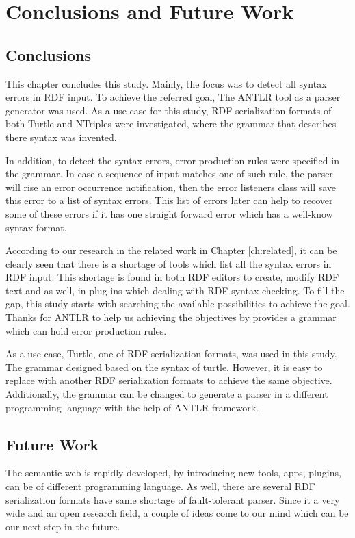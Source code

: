 \chapter{Conclusions and Future Work}
\label{ch:conclusions}

\section{Conclusions}
This chapter concludes this study. Mainly, the focus was to detect all syntax errors in RDF input. To achieve the referred goal, The ANTLR tool as a parser generator was used. As a use case for this study, RDF serialization formats of both Turtle and NTriples were investigated, where the grammar that describes there syntax was invented.

In addition, to detect the syntax errors, error production rules were specified in the grammar. In case a sequence of input matches one of such rule, the parser will rise an error occurrence notification, then the error listeners class will save this error to a list of syntax errors. This list of errors later can help to recover some of these errors if it has one straight forward error which has a well-know syntax format. 

According to our research in the related work in Chapter \ref{ch:related}, it can be clearly seen that there is a shortage of tools which list all the syntax errors in RDF input. This shortage is found in both RDF editors to create, modify RDF text and as well, in plug-ins which dealing with RDF syntax checking. To fill the gap, this study starts with searching the available possibilities to achieve the goal. Thanks for ANTLR to help us achieving the objectives by provides a grammar which can hold error production rules. 

As a use case, Turtle, one of RDF serialization formats, was used in this study. The grammar designed based on the syntax of turtle. However, it is easy to replace with another RDF serialization formats to achieve the same objective. Additionally, the grammar can be changed to generate a parser in a different programming language with the help of ANTLR framework.   
\section{Future Work}
The semantic web is rapidly developed, by introducing new tools, apps, plugins, can be of different programming language. As well, there are several RDF serialization  formats have same shortage of fault-tolerant parser. 
Since it a very wide and an open research field, a couple of ideas come to our mind which can be our next step in the future. 



